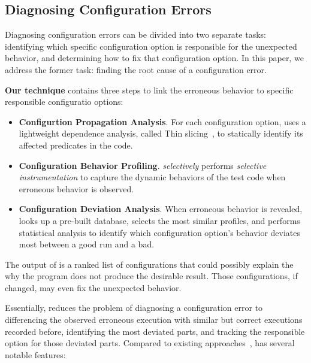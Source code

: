 
\subsection{Diagnosing Configuration Errors}

Diagnosing configuration errors can be divided into two
separate tasks: identifying which specific configuration option is
responsible for the unexpected behavior, and determining how to fix that
configuration option. In this paper, we address the former task: finding
the root cause of a configuration error.


\textbf{Our technique} contains three steps to 
link the erroneous behavior to specific responsible configuratio options:

\begin{itemize}
\item \textbf{Configurtion Propagation Analysis}. For
each configuration option, \ourtool
uses a lightweight dependence analysis, called Thin slicing~\cite{Sridharan:2007},
to statically identify its affected predicates in the code.

\item \textbf{Configuration Behavior Profiling}. \ourtool
\textit{selectively} 
performs \textit{selective instrumentation} to capture the
dynamic behaviors of the test code when erroneous behavior
is observed.

\item \textbf{Configuration Deviation Analysis}.
When erroneous behavior is revealed, \ourtool looks up a
pre-built database, selects the most similar profiles, and
performs statistical analysis to identify which configuration
option's behavior deviates most between a good run and a bad.

\end{itemize}

The output of \ourtool is a ranked list of
configurations that could possibly explain the why the program does not produce the desirable result. Those
configurations, if changed, may even fix the unexpected behavior.

Essentially, \ourtool reduces the problem of diagnosing a
configuration error to differencing the observed erroneous 
execution with similar but correct executions recorded before,
identifying the most deviated parts, and tracking the responsible
option for those deviated parts.
Compared to existing approaches~\cite{Zeller:2002:ICC, Zhang:2003:PDS,
Rabkin:2011:PPC, Whitaker:2004:CDS, Attariyan:2010:ACT, Wang:2004:AMT}, \ourtool has
several notable features:

